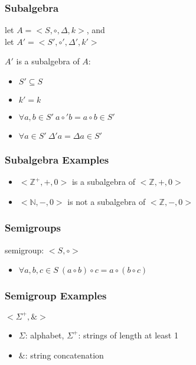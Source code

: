 \documentclass[dvipsnames]{beamer}
\begin{document}
\begin{frame}
  \frametitle{Subalgebra}

  \begin{definition}
    let $A = <S,\circ,\Delta,k>$, and\\
    let $A' = <S',\circ',\Delta',k'>$

    \medskip
    $A'$ is a \alert{subalgebra} of $A$:

    \pause
    \medskip
    \begin{itemize}
      \item $S' \subseteq S$
      \item $k' = k$
      \item $\forall a,b \in S'~a \circ' b = a \circ b \in S'$
      \item $\forall a \in S'~\Delta' a = \Delta a \in S'$
    \end{itemize}
  \end{definition}
\end{frame}

\begin{frame}
  \frametitle{Subalgebra Examples}

  \begin{example}
    \begin{itemize}
      \item $<\mathbb{Z}^+,+,0>$ is a subalgebra of $<\mathbb{Z},+,0>$
      \pause
      \item $<\mathbb{N},-,0>$ is not a subalgebra of $<\mathbb{Z},-,0>$
    \end{itemize}
  \end{example}
\end{frame}

\begin{frame}
  \frametitle{Semigroups}

  \begin{definition}
    \alert{semigroup}: $<S,\circ>$
    \begin{itemize}
      \item $\forall a,b,c \in S~(a \circ b) \circ c = a \circ (b \circ c)$
    \end{itemize}
  \end{definition}
\end{frame}

\begin{frame}
  \frametitle{Semigroup Examples}

  \begin{example}
    $<\Sigma^+,\&>$

    \begin{itemize}
      \item $\Sigma$: alphabet, $\Sigma^+$: strings of length at least 1
      \item $\&$: string concatenation
    \end{itemize}
  \end{example}
\end{frame}
\end{document}
